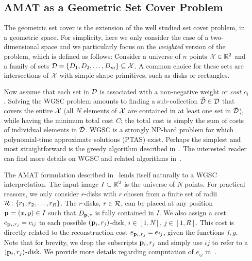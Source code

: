 \documentclass[10pt,twocolumn,letterpaper]{article}
\begin{document}
\subsection{AMAT as a Geometric Set Cover Problem}\label{sec:method:wgsc}
The geometric set cover is the extension of the well studied set cover problem, in a geometric space.
For simplicity, here we only consider the case of a two-dimensional space and we particularly focus on the 
\emph{weighted} version of the problem, which is defined as follows:
Consider a universe of $n$ points $\mathcal{X} \in \mathbb{R}^2$ and a family of sets 
$\mathcal{D} = \{D_1,D_2,\ldots,D_m\} \subseteq \mathcal{X}$. 
A common choice for these sets are intersections of $\mathcal{X}$ with simple shape primitives, such as disks or rectangles.

Now assume that each set in $\mathcal{D}$ is associated with a non-negative weight or \emph{cost} $c_i$.
Solving the WGSC problem amounts to finding a sub-collection $\bar{\mathcal{D}} \in \mathcal{D}$ that covers the entire $\mathcal{X}$
(all $N$ elements of $\mathcal{X}$ are contained in at least one set in $\bar{\mathcal{D}}$), while having the minimum
total cost $C$; the total cost is simply the sum of costs of individual elements in $\bar{\mathcal{D}}$.
WGSC is a strongly NP-hard problem for which polynomial-time approximate solutions (PTAS) exist.
Perhaps the simplest and most straightforward is the greedy algorithm described in~\cite{vazirani2013approximation}. 
The interested reader can find more details on WGSC and related algorithms 
in~\cite{mustafa2015quasi,varadarajan2010weighted,har2012weighted,chan2012weighted}.

The AMAT formulation described in~ lends itself naturally to a 
WGSC interpretation.
The input image $I\subset\mathbb{R}^2$ is the universe of $N$ points.
For practical reasons, we only consider $r$-disks with $r$ chosen from a finite set of radii $\mathcal{R}:\{r_1,r_2,\ldots,r_R\}$.
The $r$-disks, $r\in\mathcal{R}$, can be placed at any position $\mathbf{p}_{}=(x,y)\in I$ such that $D_{\mathbf{p}_{},r}$ is fully contained in $I$.
We also assign a cost $c_{\mathbf{p}_{i},r_j} = c_{ij}$ to each possible $(\mathbf{p}_{i},r_j)$-disk, $i\in[1,N],\, j\in[1,R]$.
This cost is directly related to the reconstruction cost 
$e_{\mathbf{p}_{i},r_j} = e_{ij}$, given the functions $f,g$.
Note that for brevity, we drop the subscripts $\mathbf{p}_{i},r_j$ and simply use $ij$ to refer to a $(\mathbf{p}_{i},r_j)$-disk.
We provide more details regarding computation of $e_{ij}$ in~.
\end{document}
